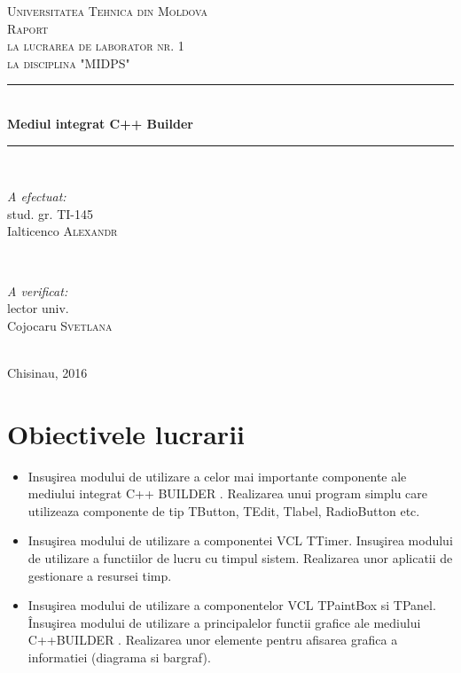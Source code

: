 \documentclass[12pt]{article}
\begin{document}
\begin{titlepage}

\newcommand{\HRule}{\rule{\linewidth}{0.5mm}}

\center 
\textsc{\LARGE Universitatea Tehnica din Moldova}\\[1.5cm] \textsc{\Large Raport}\\[0.5cm] 
\textsc{\large la lucrarea de laborator nr. 1 \\la disciplina "MIDPS"}\\[0.5cm]
\HRule \\[0.4cm]
{ \huge \bfseries Mediul integrat C++ Builder}\\[0.4cm]
\HRule \\[1.5cm]
\begin{minipage}{0.4\textwidth}
\begin{flushleft} \large
\emph{A efectuat:}\\
stud. gr. TI-145\\
Ialticenco \textsc{Alexandr}
\end{flushleft}
\end{minipage}
~
\begin{minipage}{0.4\textwidth}
\begin{flushright} \large
\emph{A verificat:} \\
lector univ.\\
Cojocaru \textsc{Svetlana}
\end{flushright}
\end{minipage}\\[4cm]
\vfill 
{\large Chisinau, 2016}\\[10cm] 
\end{titlepage}
\section*{Obiectivele lucrarii}
\begin{itemize}
\item Insuşirea modului de utilizare a celor mai importante componente ale mediului integrat C++ BUILDER . Realizarea unui program simplu care utilizeaza componente de tip TButton, TEdit, Tlabel, RadioButton  etc.  
\item Insuşirea modului de utilizare a componentei VCL TTimer. Insuşirea modului de utilizare a functiilor de lucru cu timpul sistem. Realizarea unor aplicatii de gestionare a resursei timp.
\item Insuşirea modului de utilizare a componentelor VCL  TPaintBox si TPanel. Însuşirea modului de utilizare a principalelor functii grafice ale mediului C++BUILDER . Realizarea unor elemente pentru  afisarea grafica a informatiei (diagrama si bargraf).
\end{itemize}
\end{document}

